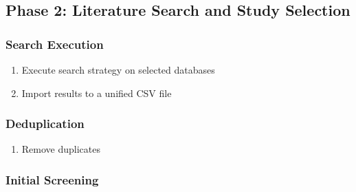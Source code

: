 \documentclass[acmsmall]{acmart}
\begin{document}
\subsection{Phase 2: Literature Search and Study Selection}\label{subsec:phase-2-literature-search-and-study-selection}
\subsubsection{Search Execution}\label{subsubsec:phase-2-literature-search-and-study-selection:search-execution}
\begin{enumerate}
    \item Execute search strategy on selected databases
    \item Import results to a unified CSV file
\end{enumerate}

\subsubsection{Deduplication}\label{subsubsec:phase-2-literature-search-and-study-selection:deduplication}

\begin{enumerate}
    \item Remove duplicates
\end{enumerate}

\subsubsection{Initial Screening}\label{subsubsec:phase-2-literature-search-and-study-selection:initial-screening}
\end{document}

